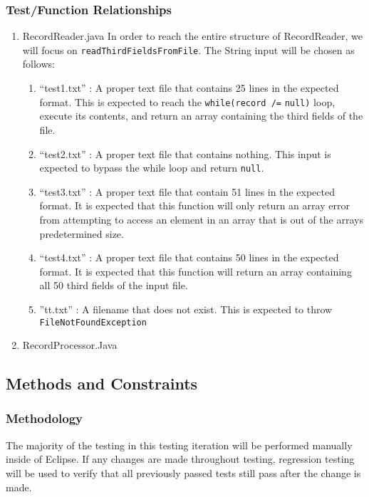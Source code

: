 \documentclass[]{article}
\begin{document}

\subsubsection{Test/Function Relationships}
\label{sub:user_characteristics}

\begin{enumerate}
  \item RecordReader.java \break
	In order to reach the entire structure of RecordReader, we will focus on
	\verb!readThirdFieldsFromFile!.  The String input will be
	chosen as follows: \begin{enumerate}
  					\item ``test1.txt'' : A proper text file that contains 25 lines in the
  					expected format.  This is expected to reach the \verb!while(record /=!
  					\verb!null)! loop, execute its contents, and return an array containing
  					the third fields of the file.
  					\item ``test2.txt'' : A proper text file that contains nothing.  This
  					input is expected to bypass the while loop and return \verb!null!.  
  					\item ``test3.txt'' : A proper text file that contain 51 lines in the
  					expected format.  It is expected that this function will only return an
  					array error from attempting to access an element in an array that is out
  					of the arrays predetermined size.
  					\item ``test4.txt'' : A proper text file that contains 50 lines in the
  					expected format.  It is expected that this function will return an array
  					containing all 50 third fields of the input file.
  					\item ''tt.txt'' : A filename that does not exist.  This is expected to
  					throw \verb!FileNotFoundException!
					\end{enumerate}
  \item RecordProcessor.Java \break
	
\end{enumerate}


\subsection{Methods and Constraints}
	\subsubsection{Methodology}
	\label{sub:user_characteristics}
	The majority of the testing in this testing iteration will be performed
	manually inside of Eclipse.  If any changes are made throughout testing,
	regression testing will be used to verify that all previously passed tests
	still pass after the change is made.
	
\end{document}
